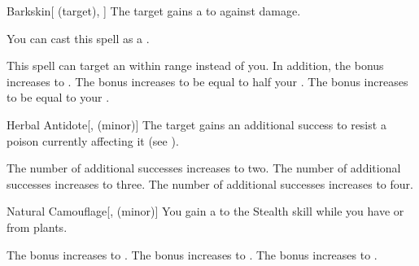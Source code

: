 \lowercase{\hypertarget{spell:Barkskin}{}}\label{spell:Barkskin}
\begin{attuneability}[Rank 1]{\hypertarget{spell:Barkskin}{Barkskin}}[ (target), ]
The target gains a   to  against  damage.

You can cast this spell as a .

\rankline
{} This spell can target an  within \rngmed range instead of you.
In addition, the bonus increases to .
 The bonus increases to be equal to half your .
 The bonus increases to be equal to your .

\end{attuneability}
\vspace{0.25em}



\lowercase{\hypertarget{spell:Herbal Antidote}{}}\label{spell:Herbal Antidote}
\begin{freeability}[Rank 1]{\hypertarget{spell:Herbal Antidote}{Herbal Antidote}}[,  (minor)]
The target gains an additional success to resist a poison currently affecting it (see ).

\rankline
{} The number of additional successes increases to two.
 The number of additional successes increases to three.
 The number of additional successes increases to four.

\end{freeability}
\vspace{0.25em}



\lowercase{\hypertarget{spell:Natural Camouflage}{}}\label{spell:Natural Camouflage}
\begin{freeability}[Rank 1]{\hypertarget{spell:Natural Camouflage}{Natural Camouflage}}[,  (minor)]
You gain a   to the Stealth skill while you have  or  from plants.

\rankline
{} The bonus increases to .
 The bonus increases to .
 The bonus increases to .

\end{freeability}
\vspace{0.25em}



